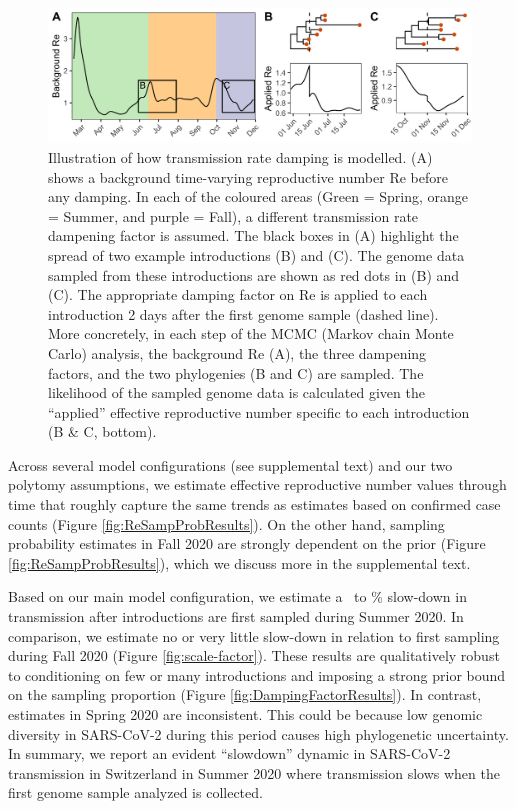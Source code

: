 \documentclass[9pt,twoside,lineno]{pnas-new} %
\begin{document}
\begin{figure}[h!]
\centering
\includegraphics[width=0.75\linewidth]{figures/phylodynamic_method_example.png}
\caption{Illustration of how transmission rate damping is modelled. (A) shows a background time-varying reproductive number Re before any damping. In each of the coloured areas (Green = Spring, orange = Summer, and purple = Fall), a different transmission rate dampening factor is assumed. The black boxes in (A) highlight the spread of two example introductions (B) and (C). The genome data sampled from these introductions are shown as red dots in (B) and (C). The appropriate damping factor on Re is applied to each introduction 2 days after the first genome sample (dashed line). More concretely, in each step of the MCMC (Markov chain Monte Carlo) analysis, the background Re (A), the three dampening factors, and the two phylogenies (B and C) are sampled. The likelihood of the sampled genome data is calculated given the ``applied'' effective reproductive number specific to each introduction (B \& C, bottom).}  
\label{fig:phylo-methods}
\end{figure}

Across several model configurations (see supplemental text) and our two polytomy assumptions, we estimate effective reproductive number values through time that roughly capture the same trends as estimates based on confirmed case counts (Figure \ref{fig:ReSampProbResults}). On the other hand, sampling probability estimates in Fall 2020 are strongly dependent on the prior (Figure \ref{fig:ReSampProbResults}), which we discuss more in the supplemental text.

Based on our main model configuration, we estimate a \summermaxdampingpercentmedianCHEnosampUB\ to \summermindampingpercentmedianCHEnosampUB\% slow-down in transmission after introductions are first sampled during Summer 2020. In comparison, we estimate no or very little slow-down in relation to first sampling during Fall 2020 (Figure \ref{fig:scale-factor}). These results are qualitatively robust to conditioning on few or many introductions and imposing a strong prior bound on the sampling proportion (Figure \ref{fig:DampingFactorResults}). In contrast, estimates in Spring 2020 are inconsistent. This could be because low genomic diversity in SARS-CoV-2 during this period causes high phylogenetic uncertainty. In summary, we report an evident ``slowdown'' dynamic in SARS-CoV-2 transmission in Switzerland in Summer 2020 where transmission slows when the first genome sample analyzed is collected.
\end{document}
